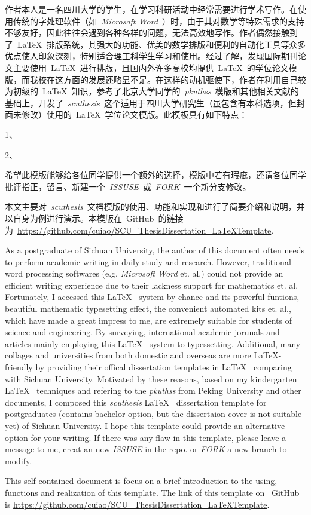 \begin{CHSabstract}
	作者本人是一名四川大学的学生，在学习科研活动中经常需要进行学术写作。在使用传统的字处理软件（如~\emph{Microsoft\textsuperscript{\textregistered} Word}~）时，由于其对数学等特殊需求的支持不够友好，因此往往会遇到各种各样的问题，无法高效地写作。作者偶然接触到了~\LaTeX~排版系统，其强大的功能、优美的数学排版和便利的自动化工具等众多优点使人印象深刻，特别适合理工科学生学习和使用。经过了解，发现国际期刊论文主要使用~\LaTeX~进行排版，且国内外许多高校均提供~\LaTeX~的学位论文模版，而我校在这方面的发展还略显不足。在这样的动机驱使下，作者在利用自己较为初级的~\LaTeX~知识，参考了北京大学同学的~\emph{pkuthss}~模版和其他相关文献的基础上，开发了~\emph{scuthesis}~这个适用于四川大学研究生（虽包含有本科选项，但封面未修改）使用的~\LaTeX~学位论文模版。此模板具有如下特点：


	1、


	2、

	希望此模版能够给各位同学提供一个额外的选择，模版中若有瑕疵，还请各位同学批评指正，留言、新建一个~\emph{ISSUSE}~或~\emph{FORK}~一个新分支修改。


	本文主要对~\emph{scuthesis}~文档模版的使用、功能和实现和进行了简要介绍和说明，并以自身为例进行演示。本模版在~GitHub~的链接为~\url{https://github.com/cuiao/SCU_ThesisDissertation_LaTeXTemplate}.
\end{CHSabstract}
\begin{ENGabstract}
	As a postgraduate of Sichuan University, the author of this document often needs to perform academic writing in daily study and research. However, traditional word processing softwares (e.g. \emph{Microsoft\textsuperscript{\textregistered} Word} et. al.) could not provide an efficient writing experience due to their lackness support for mathematics et. al. Fortunately, I accessed this \LaTeX~ system by chance and its powerful funtions, beautiful mathematic typesetting effect, the convenient automated kits et. al., which have made a great impress to me, are extremely suitable for students of science and engineering. By surveying, international academic jorunals and articles mainly employing this \LaTeX~ system to typessetting. Additional, many collages and universities from both domestic and overseas are more \LaTeX-friendly by providing their offical dissertation templates in \LaTeX~ comparing with Sichuan University. Motivated by these reasons, based on my kindergarten \LaTeX~ techniques and refering to the \emph{pkuthss} from Peking University and other documents, I composed this \emph{scuthesis} \LaTeX~ dissertation template for postgraduates (contains bachelor option, but the dissertaion cover is not suitable yet) of Sichuan University. I hope this template could provide an alternative option for your writing. If there was any flaw in this template, please leave a message to me, creat an new \emph{ISSUSE} in the repo. or \emph{FORK} a new branch to modify.


	This self-contained document is focus on a brief introduction to the using, functions and realization of this template. The link of this template on ~GitHub~ is \url{https://github.com/cuiao/SCU_ThesisDissertation_LaTeXTemplate}.
\end{ENGabstract}

